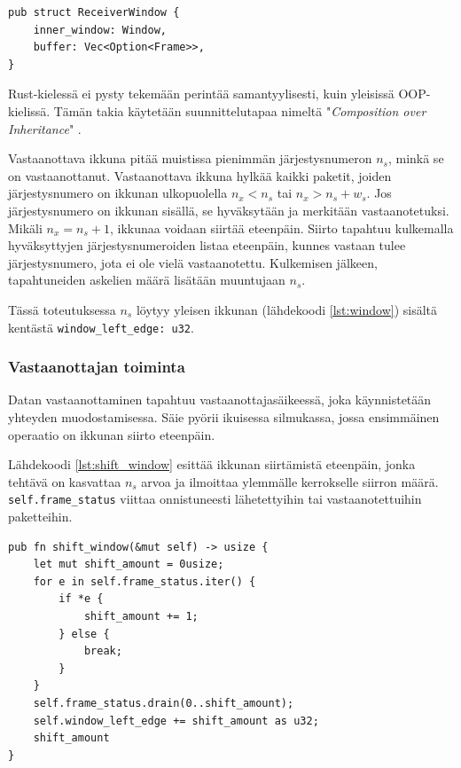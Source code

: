 \documentclass[a4paper,12pt]{article}
\begin{document}
\begin{lstlisting}[caption={Vastaanottajan ikkunan rakenne}, label={lst:rwindow}]
pub struct ReceiverWindow {
    inner_window: Window,
    buffer: Vec<Option<Frame>>,
}\end{lstlisting}

    Rust-kielessä ei pysty tekemään perintää samantyylisesti, kuin yleisissä OOP-kielissä. Tämän takia
    käytetään suunnittelutapaa nimeltä "\textit{Composition over Inheritance}" \cite{Ivicevic202228Inheritance}.

    Vastaanottava ikkuna pitää muistissa pienimmän järjestysnumeron $n_s$, minkä se on vastaanottanut.
    Vastaanottava ikkuna hylkää kaikki paketit, joiden järjestysnumero on ikkunan ulkopuolella $n_x < n_s$ tai $n_x > n_s + w_s$. Jos järjestysnumero on ikkunan sisällä, se hyväksytään ja merkitään vastaanotetuksi. Mikäli $n_x = n_s + 1$, ikkunaa voidaan siirtää eteenpäin.
    Siirto tapahtuu kulkemalla hyväksyttyjen järjestysnumeroiden listaa eteenpäin, kunnes vastaan tulee järjestysnumero, jota ei ole vielä vastaanotettu. Kulkemisen jälkeen, tapahtuneiden askelien määrä lisätään muuntujaan $n_s$.

    Tässä toteutuksessa $n_s$ löytyy yleisen ikkunan (lähdekoodi \ref{lst:window}) sisältä kentästä \lstinline{window_left_edge: u32}.


    \subsubsection{Vastaanottajan toiminta}
    Datan vastaanottaminen tapahtuu vastaanottajasäikeessä, joka käynnistetään yhteyden muodostamisessa.
    Säie pyörii ikuisessa silmukassa, jossa ensimmäinen operaatio on ikkunan siirto eteenpäin.

    Lähdekoodi \ref{lst:shift_window} esittää ikkunan siirtämistä eteenpäin, jonka tehtävä on kasvattaa $n_s$ arvoa ja ilmoittaa ylemmälle kerrokselle siirron määrä.
    \lstinline{self.frame_status} viittaa onnistuneesti lähetettyihin tai vastaanotettuihin paketteihin.

    \begin{lstlisting}[caption={Ikkunan siirto}, label={lst:shift_window}]
pub fn shift_window(&mut self) -> usize {
    let mut shift_amount = 0usize;
    for e in self.frame_status.iter() {
        if *e {
            shift_amount += 1;
        } else {
            break;
        }
    }
    self.frame_status.drain(0..shift_amount);
    self.window_left_edge += shift_amount as u32;
    shift_amount
}\end{lstlisting}
\end{document}
